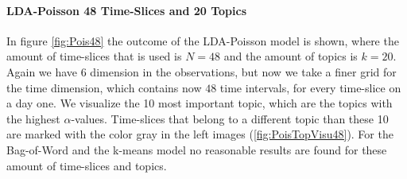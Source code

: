 \documentclass[a4paper,fleqn]{article}
\begin{document}
\paragraph{LDA-Poisson 48 Time-Slices and 20 Topics}
In figure \ref{fig:Pois48} the outcome of the LDA-Poisson model is shown, where the amount of time-slices that is used is $N=48$ and the amount of topics is $k=20$. Again we have 6 dimension in the observations, but now we take a finer grid for the time dimension, which contains now $48$ time intervals, for every time-slice on a day one. We visualize the 10 most important topic, which are the topics with the highest $\alpha$-values. Time-slices that belong to a different topic than these 10 are marked with the color gray in the left images (\ref{fig:PoisTopVisu48}).
For the Bag-of-Word and the k-means model no reasonable results are found for these amount of time-slices and topics.	
\end{document}
